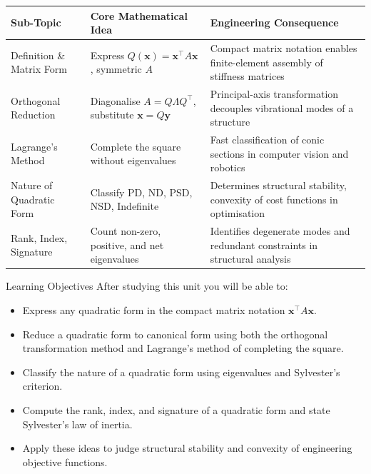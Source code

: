 \documentclass[12pt,a4paper]{article}
\begin{document}
\begin{center}
\begin{tabular}{@{}p{3.5cm}p{5cm}p{6cm}@{}}
\toprule
\textbf{Sub-Topic} & \textbf{Core Mathematical Idea} & \textbf{Engineering Consequence} \\
\midrule
Definition \& Matrix Form
  & Express $Q(\mathbf{x}) = \mathbf{x}^{\top}A\mathbf{x}$, symmetric $A$
  & Compact matrix notation enables finite-element assembly of stiffness matrices \\
\addlinespace
Orthogonal Reduction
  & Diagonalise $A = Q\Lambda Q^{\top}$, substitute $\mathbf{x} = Q\mathbf{y}$
  & Principal-axis transformation decouples vibrational modes of a structure \\
\addlinespace
Lagrange's Method
  & Complete the square without eigenvalues
  & Fast classification of conic sections in computer vision and robotics \\
\addlinespace
Nature of Quadratic Form
  & Classify PD, ND, PSD, NSD, Indefinite
  & Determines structural stability, convexity of cost functions in optimisation \\
\addlinespace
Rank, Index, Signature
  & Count non-zero, positive, and net eigenvalues
  & Identifies degenerate modes and redundant constraints in structural analysis \\
\bottomrule
\end{tabular}
\end{center}

\begin{learnbox}{Learning Objectives}
After studying this unit you will be able to:
\begin{itemize}[leftmargin=1.5em]
  \item Express any quadratic form in the compact matrix notation $\mathbf{x}^{\top}A\mathbf{x}$.
  \item Reduce a quadratic form to canonical form using both the orthogonal transformation method and Lagrange's method of completing the square.
  \item Classify the nature of a quadratic form using eigenvalues and Sylvester's criterion.
  \item Compute the rank, index, and signature of a quadratic form and state Sylvester's law of inertia.
  \item Apply these ideas to judge structural stability and convexity of engineering objective functions.
\end{itemize}
\end{learnbox}
\end{document}
